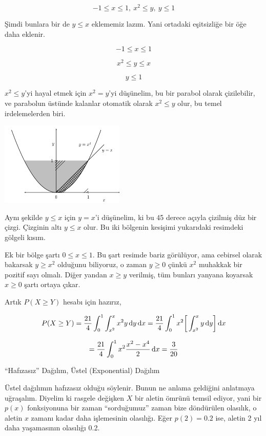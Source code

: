 \documentclass[12pt,fleqn]{article}\usepackage{../../common}
\begin{document}
$$ -1 \le x \le 1, \  x^2 \le y, \ y \le 1   $$

Şimdi bunlara bir de $y \le x$ eklememiz lazım. Yani ortadaki eşitsizliğe
bir öğe daha eklenir.

$$ -1 \le x \le 1 $$

$$  x^2 \le y \le x $$

$$  y \le 1   $$

$x^2 \le y$'yi hayal etmek için $x^2 = y$'yi düşünelim, bu bir parabol
olarak çizilebilir, ve parabolun üstünde kalanlar otomatik olarak $x^2 \le y$ 
olur, bu temel irdelemelerden biri. 

\includegraphics[height=4cm]{stat_intro_07.png}

Aynı şekilde $y \le x$ için $y = x$'i düşünelim, ki bu 45 derece açıyla
çizilmiş düz bir çizgi. Çizginin altı $y \le x$ olur. Bu iki bölgenin
kesişimi yukarıdaki resimdeki gölgeli kısım. 

Ek bir bölge şartı $0 \le x \le 1$. Bu şart resimde bariz görülüyor, ama
cebirsel olarak bakarsak $y \ge x^2$ olduğunu biliyoruz, o zaman $y \ge 0$
çünkü $x^2$ muhakkak bir pozitif sayı olmalı. Diğer yandan $x \ge y$
verilmiş, tüm bunları yanyana koyarsak $x \ge 0$ şartı ortaya çıkar. 

Artık $P(X \ge Y)$ hesabı için hazırız, 

$$
P(X \ge Y) = 
\frac{ 21}{4} \int_{ 0}^{1} \int _{ x^2}^{x} x^2y \,\mathrm{d} y \,\mathrm{d} x = 
\frac{ 21}{4} \int_{ 0}^{1} x^2 \bigg[ \int _{ x^2}^{x} y \,\mathrm{d} y \bigg] \,\mathrm{d} x 
$$

$$ = \frac{21}{4} \int _{ 0}^{1} x^2 \frac{ x^2 - x^4}{2} \,\mathrm{d} x = \frac{3}{20} $$

``Hafızasız'' Dağılım, Üstel (Exponential) Dağılım

Üstel dağılımın hafızasız olduğu söylenir. Bunun ne anlama geldiğini
anlatmaya uğraşalım. Diyelim ki rasgele değişken $X$ bir aletin ömrünü
temsil ediyor, yani bir $p(x)$ fonksiyonuna bir zaman ``sorduğumuz'' zaman
bize döndürülen olasılık, o aletin $x$ zamanı kadar daha işlemesinin
olasılığı. Eğer $p(2) = 0.2$ ise, aletin 2 yıl daha yaşamasının olasılığı
0.2. 
\end{document}
